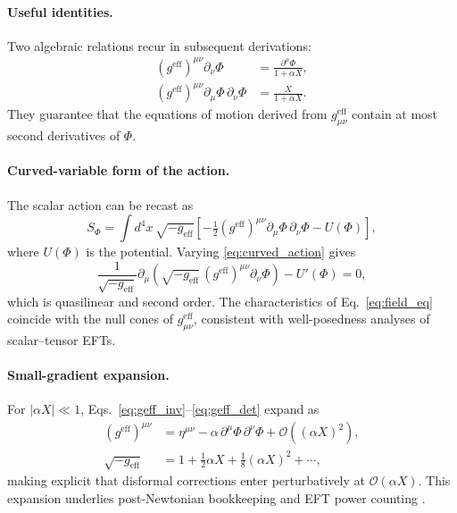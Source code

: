 \documentclass{article}
\begin{document}
\paragraph*{Useful identities.}
Two algebraic relations recur in subsequent derivations:
\begin{align}
(g^{\mathrm{eff}})^{\mu\nu}\partial_\nu \Phi &= \frac{\partial^\mu \Phi}{1+\alpha X},
\label{eq:raise_lower}\\
(g^{\mathrm{eff}})^{\mu\nu}\partial_\mu\Phi\,\partial_\nu\Phi &= \frac{X}{1+\alpha X}.
\label{eq:contraction}
\end{align}
They guarantee that the equations of motion derived from $g^{\mathrm{eff}}_{\mu\nu}$ contain at most second derivatives of $\Phi$.

\paragraph*{Curved-variable form of the action.}
The scalar action can be recast as
\begin{equation}
S_\Phi = \int d^4x\,\sqrt{-g_{\mathrm{eff}}}
\left[-\tfrac{1}{2}(g^{\mathrm{eff}})^{\mu\nu}\partial_\mu\Phi\,\partial_\nu\Phi - U(\Phi)\right],
\label{eq:curved_action}
\end{equation}
where $U(\Phi)$ is the potential. Varying \eqref{eq:curved_action} gives
\begin{equation}
\frac{1}{\sqrt{-g_{\mathrm{eff}}}}
\partial_\mu\!\left(\sqrt{-g_{\mathrm{eff}}}\,(g^{\mathrm{eff}})^{\mu\nu}\partial_\nu\Phi\right)
- U'(\Phi) = 0 ,
\label{eq:field_eq}
\end{equation}
which is quasilinear and second order. The characteristics of Eq.~\eqref{eq:field_eq} coincide with the null cones of $g^{\mathrm{eff}}_{\mu\nu}$, consistent with well-posedness analyses of scalar–tensor EFTs.

\paragraph*{Small-gradient expansion.}
For $|\alpha X|\ll1$, Eqs.~\eqref{eq:geff_inv}–\eqref{eq:geff_det} expand as
\begin{align}
(g^{\mathrm{eff}})^{\mu\nu} &= \eta^{\mu\nu} - \alpha\,\partial^\mu\Phi\,\partial^\nu\Phi + \mathcal{O}((\alpha X)^2),
\label{eq:inv_small}\\[4pt]
\sqrt{-g_{\mathrm{eff}}} &= 1 + \tfrac{1}{2}\alpha X + \tfrac{1}{8}(\alpha X)^2 + \cdots ,
\label{eq:det_small}
\end{align}
making explicit that disformal corrections enter perturbatively at $\mathcal{O}(\alpha X)$. This expansion underlies post-Newtonian bookkeeping and EFT power counting \cite{Burgess2007_EFT,Burgess2020_EFTbook}.
\end{document}
